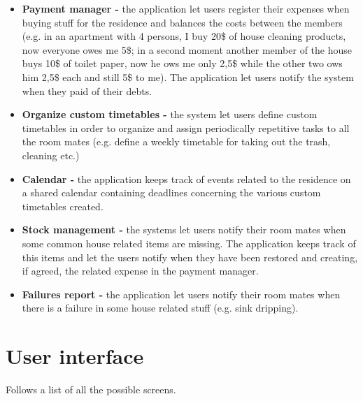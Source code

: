 \documentclass[]{article}
\begin{document}
		\begin{itemize}
			\item \textbf{Payment manager -} the application let users register their expenses when buying stuff for the residence and balances the costs between the members (e.g. in an apartment with 4 persons, I buy 20\$ of house cleaning products, now everyone owes me 5\$; in a second moment another member of the house buys 10\$ of toilet paper, now he ows me only 2,5\$ while the other two ows him 2,5\$ each and still 5\$ to me).
			\newline The application let users notify the system when they paid of their debts.
			\item \textbf{Organize custom timetables -} the system let users define custom timetables in order to organize and assign periodically repetitive tasks to all the room mates (e.g. define a weekly timetable for taking out the trash, cleaning etc.)
			\item \textbf{Calendar -} the application keeps track of events related to the residence on a shared calendar containing deadlines concerning the various custom timetables created.
			\item \textbf{Stock management -} the systems let users notify their room mates when some common house related items are missing. The application keeps track of this items and let the users notify when they have been restored and creating, if agreed, the related expense in the payment manager.
			\item \textbf{Failures report -} the application let users notify their room mates when there is a failure in some house related stuff (e.g. sink dripping).

		\end{itemize}


	\section{User interface}
	
	Follows a list of all the possible screens.
	
\end{document}
